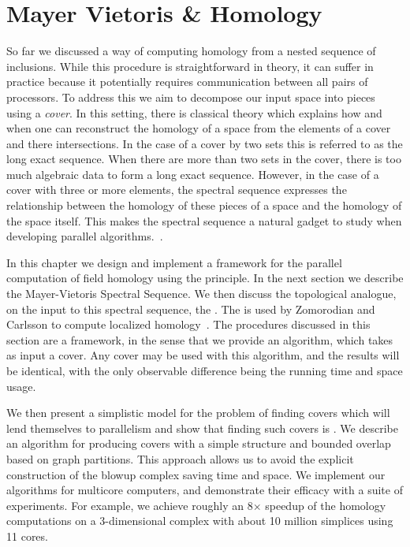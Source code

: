 \chapter{Mayer Vietoris \& Homology}
So far we discussed a way of computing homology from a 
nested sequence of inclusions. While this procedure is straightforward in theory, it can suffer in practice
because it potentially requires communication between all pairs of processors. To address this
we aim to decompose our input space into pieces using a \emph{cover}. In this setting, 
there is classical theory which explains how and when one can reconstruct the homology of a space
from the elements of a cover and there intersections. In the case of a cover by two sets this is referred to as
the \mv long exact sequence. When there are more than two sets in the cover, 
there is too much algebraic data to form a long exact sequence. 
However, in the case of a cover with three or more elements, the \mv spectral sequence expresses 
the relationship between the homology of these pieces of a space and the homology of the space itself.
This makes the \mv spectral sequence a natural gadget to study when developing parallel algorithms.~\cite{hatcher}. 

In this chapter we design and implement a framework for the parallel computation of field homology using the \mv principle. In the next section we describe the Mayer-Vietoris Spectral Sequence. We then discuss the topological analogue, on the input to this spectral sequence, the \mvb{}.  
The \mvb{} is used by Zomorodian and Carlsson to compute localized homology~\cite{zc-lh-08}.  The procedures discussed in this section 
are a framework, in the sense that we provide an algorithm, which takes as input a cover. Any cover may be used with this algorithm,
and the results will be identical, with the only observable difference being the running time and space usage. 

We then present a simplistic model for the problem of finding covers which will lend themselves to parallelism and show that finding such covers is \NPH{}.
We describe an algorithm for producing covers with a simple structure and bounded overlap based on graph partitions. This approach allows
us to avoid the explicit construction of the blowup complex saving time and space. We implement our algorithms for multicore computers, 
and demonstrate their efficacy with a suite of experiments.  For example, we achieve roughly an 8$\times$ 
speedup of the homology computations on a 3-dimensional complex with about 10 million simplices using 11 cores.


